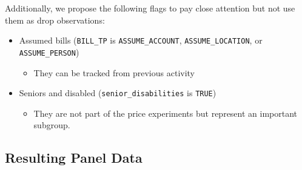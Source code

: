\documentclass[11pt]{article}
\begin{document}
Additionally, we propose the following flags to pay close attention but not use them as drop observations:
\begin{itemize}
	\item Assumed bills (\texttt{BILL\_TP} is \texttt{ASSUME\_ACCOUNT}, \texttt{ASSUME\_LOCATION}, or \texttt{ASSUME\_PERSON})
	\begin{itemize}
		\item They can be tracked from previous activity
	\end{itemize}
	\item Seniors and disabled (\texttt{senior\_disabilities} is \texttt{TRUE})
	\begin{itemize}
		\item They are not part of the price experiments but represent an important subgroup.
	\end{itemize}
\end{itemize}

\subsection*{Resulting Panel Data}
\end{document}
